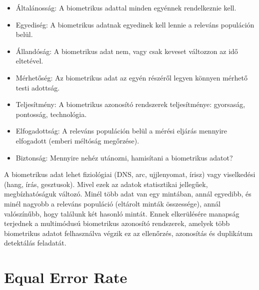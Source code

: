 \begin{itemize}
	\item Általánosság: A biometrikus adattal minden egyénnek rendelkeznie kell.
	\item Egyediség: A biometrikus adatnak egyedinek kell lennie a releváns populáción belül.
	\item Állandóság: A biometrikus adat nem, vagy csak keveset változzon az idő eltetével.
	\item Mérhetőség: Az biometrikus adat az egyén részéről legyen könnyen mérhető testi adottság.
	\item Teljesítmény: A biometrikus azonosító rendszerek teljesítménye: gyorsaság, pontosság, technológia.
	\item Elfogadottság: A releváns populáción belül a mérési eljárás mennyire elfogadott (emberi méltóság megőrzése).
	\item Biztonság: Mennyire nehéz utánozni, hamisítani a biometrikus adatot?
\end{itemize}

A biometrikus adat lehet fiziológiai (DNS, arc, ujjlenyomat, írisz) vagy viselkedési (hang, írás, gesztusok). Mivel ezek az adatok statisztikai jellegűek, megbízhatóságuk változó. Minél több adat van egy mintában, annál egyedibb, és minél nagyobb a releváns populáció (eltárolt minták összessége), annál valószínűbb, hogy találunk két hasonló mintát. Ennek elkerülésére manapság terjednek a multimódusú biometrikus azonosító rendszerek, amelyek több biometrikus adatot felhasználva végzik ez az ellenőrzés, azonosítás és duplikátum detektálás feladatát. 

\section{Equal Error Rate}

